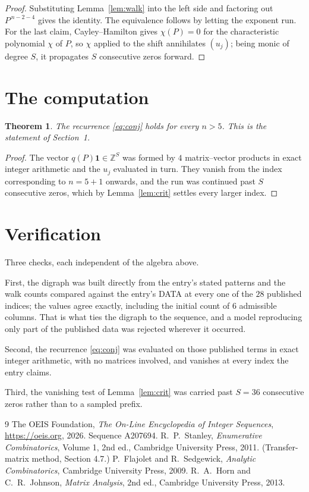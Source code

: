 \documentclass[11pt,a4paper]{article}
\theoremstyle{plain}
\newtheorem{theorem}{Theorem}
\theoremstyle{definition}
\begin{document}
\begin{proof}
Substituting Lemma~\ref{lem:walk} into the left side and factoring out
$P^{\,n-2-4}$ gives the identity. The equivalence follows by letting the exponent
run. For the last claim, Cayley--Hamilton gives $\chi(P)=0$ for the characteristic
polynomial $\chi$ of $P$, so $\chi$ applied to the shift annihilates $(u_j)$; being monic of
degree $S$, it propagates $S$ consecutive zeros forward.
\end{proof}

\section{The computation}

\begin{theorem}
The recurrence \eqref{eq:conj} holds for every $n>5$. This is the statement of
Section~1.
\end{theorem}

\begin{proof}
The vector $q(P)\mathbf{1}\in\mathbb{Z}^{S}$ was formed by $4$ matrix--vector
products in exact integer arithmetic and the $u_j$ evaluated in turn. They vanish from the
index corresponding to $n=5+1$ onwards, and the run was continued past $S$ consecutive
zeros, which by Lemma~\ref{lem:crit} settles every larger index.
\end{proof}

\section{Verification}

Three checks, each independent of the algebra above.

First, the digraph was built directly from the entry's stated patterns and the walk counts
compared against the entry's DATA at every one of the $28$ published indices; the
values agree exactly, including the initial count of $6$ admissible columns. That is
what ties the digraph to the sequence, and a model reproducing only part of the published
data was rejected wherever it occurred.

Second, the recurrence \eqref{eq:conj} was evaluated on those published terms in exact
integer arithmetic, with no matrices involved, and vanishes at every index the entry claims.

Third, the vanishing test of Lemma~\ref{lem:crit} was carried past $S=36$ consecutive
zeros rather than to a sampled prefix.

\begin{thebibliography}{9}
 The OEIS Foundation, \emph{The On-Line Encyclopedia of Integer
Sequences}, \url{https://oeis.org}, 2026. Sequence A207694.
 R.~P.~Stanley, \emph{Enumerative Combinatorics}, Volume 1, 2nd ed.,
Cambridge University Press, 2011. (Transfer-matrix method, Section 4.7.)
 P.~Flajolet and R.~Sedgewick, \emph{Analytic Combinatorics}, Cambridge
University Press, 2009.
 R.~A.~Horn and C.~R.~Johnson, \emph{Matrix Analysis}, 2nd ed., Cambridge
University Press, 2013.
\end{thebibliography}
\end{document}
